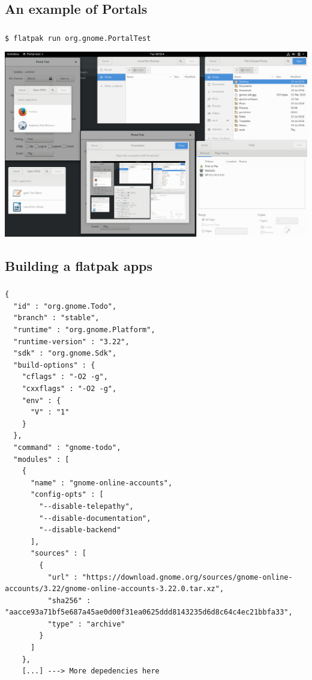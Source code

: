 \subsection{An example of Portals}
\begin{frame}[fragile]
  \frametitle{\insertsubsection}

  \texttt{\$ flatpak run org.gnome.PortalTest}
  \begin{center}
    \includegraphics[width=1\textwidth]{images/portals.png}
  \end{center}

\end{frame}

\subsection{Building a flatpak apps}
\begin{frame}[fragile]
  \frametitle{\insertsubsection}

    \begin{tiny}
\begin{verbatim}
{
  "id" : "org.gnome.Todo",
  "branch" : "stable",
  "runtime" : "org.gnome.Platform",
  "runtime-version" : "3.22",
  "sdk" : "org.gnome.Sdk",
  "build-options" : {
    "cflags" : "-O2 -g",
    "cxxflags" : "-O2 -g",
    "env" : {
      "V" : "1"
    }
  },
  "command" : "gnome-todo",
  "modules" : [
    {
      "name" : "gnome-online-accounts",
      "config-opts" : [
        "--disable-telepathy",
        "--disable-documentation",
        "--disable-backend"
      ],
      "sources" : [
        {
          "url" : "https://download.gnome.org/sources/gnome-online-accounts/3.22/gnome-online-accounts-3.22.0.tar.xz",
          "sha256" : "aacce93a71bf5e687a45ae0d00f31ea0625ddd8143235d6d8c64c4ec21bbfa33",
          "type" : "archive"
        }
      ]
    },
    [...] ---> More depedencies here
\end{verbatim}
    \end{tiny}
\end{frame}


